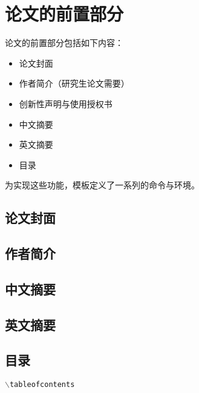 
\chapter{论文的前置部分}
\label{cha:frontmatter}

论文的前置部分包括如下内容：
\begin{itemize}
\item 论文封面
\item 作者简介（研究生论文需要）
\item 创新性声明与使用授权书
\item 中文摘要
\item 英文摘要
\item 目录
\end{itemize}

为实现这些功能，模板定义了一系列的命令与环境。


\section{论文封面}
\label{sec:cover}

\section{作者简介}
\label{sec:author}

\section{中文摘要}
\label{sec:abstract-chs}


\section{英文摘要}
\label{sec:abstract-eng}

\section{目录}
\label{sec:toc}

\texttt{$\backslash$tableofcontents}


